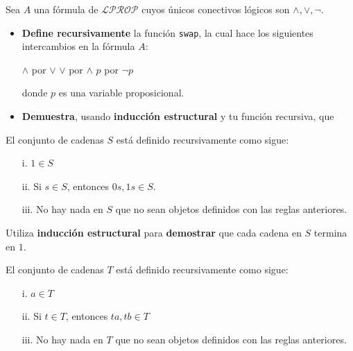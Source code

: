 \documentclass[oneside]{style}
\begin{document}
\begin{questions}[label=\protect\circled{\bfseries\arabic*}]
    \question
    {
        Sea $A$ una fórmula de $\mathcal{LPROP}$ cuyos únicos conectivos 
        lógicos son $\land, \lor, \neg$.

        \begin{itemize}
            \item \textbf{Define recursivamente} la función \texttt{swap}, la cual 
            hace los siguientes intercambios en la fórmula $A$: 
            \begin{center}
                $\land$ por $\lor$ \quad \quad $\lor$ por $\land$ \quad \quad 
                $p$ por $\neg p$
            \end{center}

            donde $p$ es una variable proposicional. 

            \item \textbf{Demuestra}, usando \textbf{inducción estructural} y 
            tu función recursiva, que 
            \begin{center}
            \end{center}
        \end{itemize}
    }

    \question
    {
        El conjunto de cadenas $S$ está definido recursivamente como sigue: 
        \begin{itemize}
            \item [i.] $1 \in S$
            \item [ii.] Si $s \in S$, entonces $0s, 1s \in S$.
            \item [iii.] No hay nada en $S$ que no sean objetos definidos con 
            las reglas anteriores.  
        \end{itemize}

        Utiliza \textbf{inducción estructural} para \textbf{demostrar} que 
        cada cadena en $S$ termina en $1$.
    }

    \question
    {
        El conjunto de cadenas $T$ está definido recursivamente como sigue:
        \begin{itemize}
            \item [i.] $a \in T$
            \item [ii.] Si $t \in T$, entonces $ta, tb \in T$
            \item [iii.] No hay nada en $T$ que no sean objetos definidos con 
            las reglas anteriores.  
        \end{itemize}

}
\end{questions}
\end{document}
